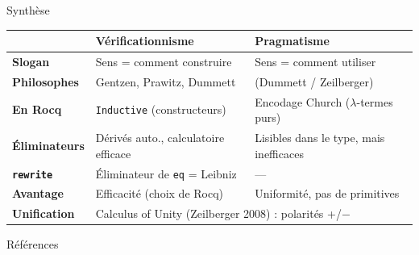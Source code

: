 \documentclass[aspectratio=169]{beamer}
\begin{document}
\begin{frame}{Synthèse}
  \begin{center}
    \footnotesize
    \begin{tabular}{p{2.8cm}p{4.5cm}p{4.5cm}}
      \hline
      & \textbf{Vérificationnisme} & \textbf{Pragmatisme} \\
      \hline
      \textbf{Slogan} & Sens = comment construire & Sens = comment utiliser \\[4pt]
      \textbf{Philosophes} & Gentzen, Prawitz, Dummett & (Dummett / Zeilberger) \\[4pt]
      \textbf{En Rocq} & \texttt{Inductive} (constructeurs) & Encodage Church ($\lambda$-termes purs) \\[4pt]
      \textbf{Éliminateurs} & Dérivés auto., calculatoire efficace & Lisibles dans le type, mais inefficaces \\[4pt]
      \textbf{\texttt{rewrite}} & Éliminateur de \texttt{eq} = Leibniz & — \\[4pt]
      \textbf{Avantage} & Efficacité (choix de Rocq) & Uniformité, pas de primitives \\[4pt]
      \textbf{Unification} & \multicolumn{2}{l}{Calculus of Unity (Zeilberger 2008) : polarités +/$-$} \\
      \hline
    \end{tabular}
  \end{center}
\end{frame}

\nocite{zeilbergerUnityDuality2008, prawitzNaturalDeduction1965, dummettLogicalBasisMetaphysics1991}
\begin{frame}[allowframebreaks]{Références}
  \printbibliography[heading=none]
\end{frame}
\end{document}

